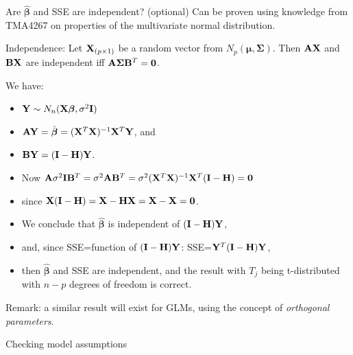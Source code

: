 \documentclass[
  ignorenonframetext,
]{beamer}
\begin{document}
\begin{frame}
\begin{block}{Are \(\hat{\boldsymbol{\beta}}\) and SSE are independent?
(optional)}
\label{are-hatboldsymbolbeta-and-sse-are-independent-optional}
Can be proven using knowledge from TMA4267 on properties of the
multivariate normal distribution.

Independence: Let \({\bf X}_{(p \times 1)}\) be a random vector from
\(N_p({\boldsymbol \mu},{\boldsymbol \Sigma})\). Then \({\bf A}{\bf X}\)
and \({\bf B}{\bf X}\) are independent iff
\({\bf A}{\boldsymbol \Sigma}{\bf B}^T={\bf 0}\).

We have:

\begin{itemize}
\item
  \({\bf Y}\sim N_n({\bf X}{\boldsymbol \beta},\sigma^2{\bf I})\)
\item
  \({\bf AY}=\hat{ {\boldsymbol \beta}}=({\bf X}^T{\bf X})^{-1}{\bf X}^T {\bf Y}\),
  and
\item
  \({\bf BY}=({\bf I}-{\bf H}){\bf Y}\).
\item
  Now
  \({\bf A}\sigma^2{\bf I}{\bf B}^T=\sigma^2 {\bf A}{\bf B}^T=\sigma^2 ({\bf X}^T{\bf X})^{-1}{\bf X}^T ({\bf I}-{\bf H})={\bf 0}\)
\item
  since
  \({\bf X}({\bf I}-{\bf H})={\bf X}-{\bf HX}={\bf X}-{\bf X}={\bf 0}\).
\item
  We conclude that \(\hat{ {\boldsymbol \beta}}\) is independent of
  \(({\bf I}-{\bf H}){\bf Y}\),
\item
  and, since SSE=function of \(({\bf I}-{\bf H}){\bf Y}\):
  SSE=\({\bf Y}^T({\bf I}-{\bf H}){\bf Y}\),
\item
  then \(\hat{ {\boldsymbol \beta}}\) and SSE are independent, and the
  result with \(T_j\) being t-distributed with \(n-p\) degrees of
  freedom is correct.
\end{itemize}

Remark: a similar result will exist for GLMs, using the concept of
\emph{orthogonal parameters}.
\end{block}
\end{frame}

\begin{frame}{Checking model assumptions}
\label{checking-model-assumptions}
\end{frame}
\end{document}

